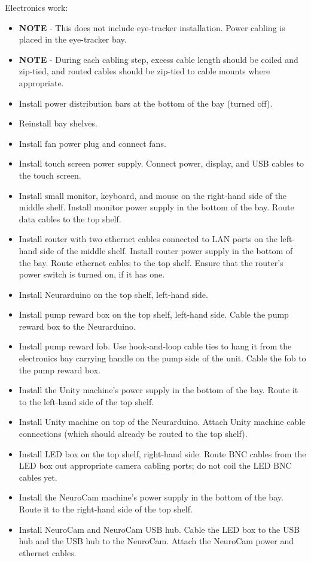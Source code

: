 Electronics work:
\begin{itemize}
\item \textbf{NOTE} - This does not include eye-tracker installation.
Power cabling is placed in the eye-tracker bay.
\item \textbf{NOTE} - During each cabling step, excess cable length should
be coiled and zip-tied, and routed cables should be zip-tied to cable mounts
where appropriate.
\item Install power distribution bars at the bottom of the bay (turned off).
\item Reinstall bay shelves.
\item Install fan power plug and connect fans.
\item Install touch screen power supply. Connect power, display, and USB
cables to the touch screen.
\item Install small monitor, keyboard, and mouse on the right-hand side of
the middle shelf. Install monitor power supply in the bottom of the bay.
Route data cables to the top shelf.
\item Install router with two ethernet cables connected to LAN ports on the
left-hand side of the middle shelf. Install router power supply in the 
bottom of the bay. Route ethernet cables to the top shelf. Ensure that the
router's power switch is turned on, if it has one.
\item Install Neurarduino on the top shelf, left-hand side.
\item Install pump reward box on the top shelf, left-hand side. Cable the
pump reward box to the Neurarduino.
\item Install pump reward fob. Use hook-and-loop cable ties to hang it from
the electronics bay carrying handle on the pump side of the unit. Cable the
fob to the pump reward box.
\item Install the Unity machine's power supply in the bottom of the bay.
Route it to the left-hand side of the top shelf.
\item Install Unity machine on top of the Neurarduino. Attach Unity machine
cable connections (which should already be routed to the top shelf).
\item Install LED box on the top shelf, right-hand side. Route BNC cables 
from the LED box out appropriate camera cabling ports; do not coil the 
LED BNC cables yet.
\item Install the NeuroCam machine's power supply in the bottom of the bay.
Route it to the right-hand side of the top shelf.
\item Install NeuroCam and NeuroCam USB hub. Cable the LED box to the
USB hub and the USB hub to the NeuroCam. Attach the NeuroCam power and
ethernet cables.
\end{itemize}

